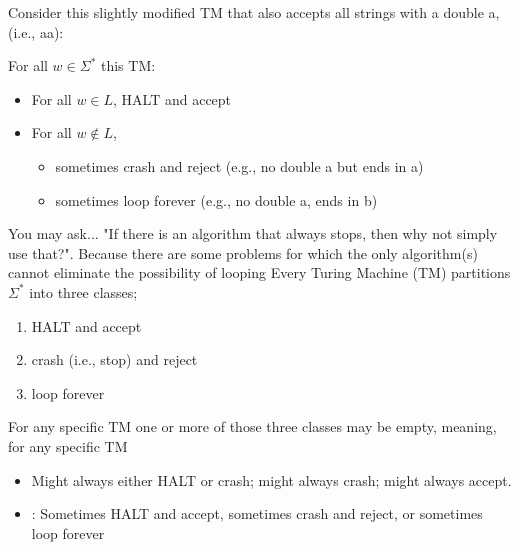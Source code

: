 \documentclass{report}
\begin{document}
\begin{itemize}
\begin{itemize}
            \end{itemize}
            \bigbreak \noindent 
            Consider this slightly modified TM that also accepts all strings with a double a, (i.e., aa):
            \bigbreak \noindent 
            \begin{figure}[ht]
                \centering
                \label{fig:tm2}
            \end{figure}
            \bigbreak \noindent 
            For all $w\in \Sigma^{*}$ this TM:
            \begin{itemize}
                \item For all $w \in L$, HALT and accept
                \item For all $w \not\in L$,
                    \begin{itemize}
                        \item sometimes crash and reject (e.g., no double a but ends in a)
                        \item sometimes loop forever (e.g., no double a, ends in b)
                    \end{itemize}
            \end{itemize}
            \bigbreak \noindent 
            You may ask... "If there is an algorithm that always stops, then why not simply use that?".
            \bigbreak \noindent 
            Because there are some problems for which the only algorithm(s) cannot eliminate the possibility of looping
            \bigbreak \noindent 
            Every Turing Machine (TM) partitions $\Sigma^{*}$ into three classes;
            \begin{enumerate}
                \item HALT and accept
                \item crash (i.e., stop) and reject
                \item loop forever 
            \end{enumerate}
            \bigbreak \noindent 
            For any specific TM one or more of those three classes may be empty, meaning, for any specific TM
            \begin{itemize}
                \item Might always either HALT or crash; might always crash; might always accept.
                \item {}: Sometimes HALT and accept, sometimes crash and reject, or sometimes loop forever
            \end{itemize}

\end{itemize}
\end{document}
